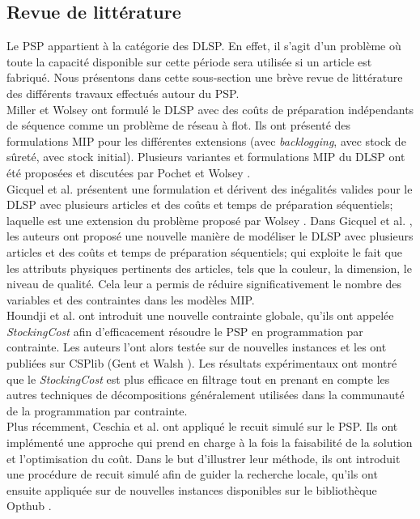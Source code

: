 	\subsection{Revue de littérature}
	Le PSP appartient à la catégorie des DLSP. En effet, il s'agit d'un problème où toute la capacité disponible sur cette période sera utilisée si un article est fabriqué. Nous présentons dans cette sous-section une brève revue de littérature des différents travaux effectués autour du PSP. \\
	\hspace*{.5cm} Miller et Wolsey \cite{miller_wolsey} ont formulé le DLSP avec des coûts de préparation indépendants de séquence comme un problème de réseau à flot. Ils ont présenté des formulations MIP pour les différentes extensions (avec \emph{backlogging}, avec stock de sûreté, avec stock initial). Plusieurs variantes et formulations MIP du DLSP ont été proposées et discutées par Pochet et Wolsey \cite{pochet_wolsey}. \\
	\hspace*{.5cm} Gicquel et al. \cite{gicquel_minoux_dallery} présentent une formulation et dérivent des inégalités valides pour le DLSP avec plusieurs articles et des coûts et temps de préparation séquentiels; laquelle est une extension du problème proposé par Wolsey \cite{wolsey}. Dans Gicquel et al. \cite {gicquel_miegeville_minoux_dallery}, les auteurs ont proposé une nouvelle manière de modéliser le DLSP avec plusieurs articles et des coûts et temps de préparation séquentiels; qui exploite le fait que les attributs physiques pertinents des articles, tels que la couleur, la dimension, le niveau de qualité. Cela leur a permis de réduire significativement le nombre des variables et des contraintes dans les modèles MIP.\\
	\hspace*{.5cm}Houndji et al. \cite{hvr_stockingCost} ont introduit une nouvelle contrainte globale, qu'ils ont appelée \emph{StockingCost} afin d'efficacement résoudre le PSP en programmation par contrainte. Les auteurs l'ont alors testée sur de nouvelles instances et les ont publiées sur CSPlib (Gent et Walsh \cite{gent_walsh}). Les résultats expérimentaux ont montré que le \emph{StockingCost} est plus efficace en filtrage tout en prenant en compte les autres techniques de décompositions généralement utilisées dans la communauté de la programmation par contrainte. \\
	\hspace*{.5cm} Plus récemment, Ceschia et al. \cite{ceschia} ont appliqué le recuit simulé sur le PSP. Ils ont implémenté une approche qui prend en charge à la fois la faisabilité de la solution et l'optimisation du coût. Dans le but d'illustrer leur méthode, ils ont introduit une procédure de recuit simulé afin de guider la recherche locale, qu'ils ont ensuite appliquée sur de nouvelles instances disponibles sur le bibliothèque Opthub \cite{opthub}.
	 
